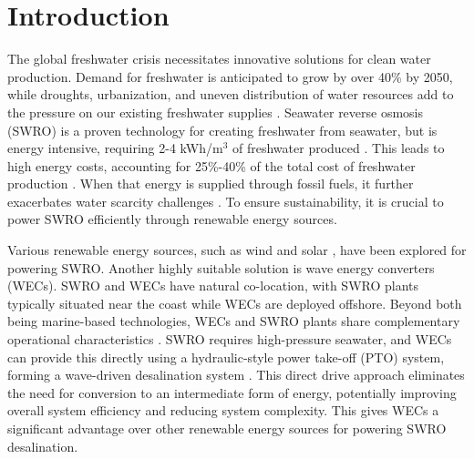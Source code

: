 \documentclass[a4paper,12pt]{elsarticle}
\begin{document}
\section{Introduction}
The global freshwater crisis necessitates innovative solutions for clean water production. Demand for freshwater is anticipated to grow by over 40\% by 2050, while droughts, urbanization, and uneven distribution of water resources add to the pressure on our existing freshwater supplies \cite{watershortage2015}. Seawater reverse osmosis (SWRO) is a proven technology for creating freshwater from seawater, but is energy intensive, requiring 2-4 kWh/m$^3$ of freshwater produced \cite{Li2018}. This leads to high energy costs, accounting for 25\%-40\% of the total cost of freshwater production \cite{blue_econ}. When that energy is supplied through fossil fuels, it further exacerbates water scarcity challenges \cite{nytdrought}. To ensure sustainability, it is crucial to power SWRO efficiently through renewable energy sources.

Various renewable energy sources, such as wind \cite{Lai2016} and solar \cite{Elkadeem2024}, have been explored for powering SWRO. Another highly suitable solution is wave energy converters (WECs). SWRO and WECs have natural co-location, with SWRO plants typically situated near the coast while WECs are deployed offshore. Beyond both being marine-based technologies, WECs and SWRO plants share complementary operational characteristics \cite{blue_econ}. SWRO requires high-pressure seawater, and WECs can provide this directly using a hydraulic-style power take-off (PTO) system, forming a wave-driven desalination system \cite{Davies2005}. This direct drive approach eliminates the need for conversion to an intermediate form of energy, potentially improving overall system efficiency and reducing system complexity. This gives WECs a significant advantage over other renewable energy sources for powering SWRO desalination.
\end{document}
